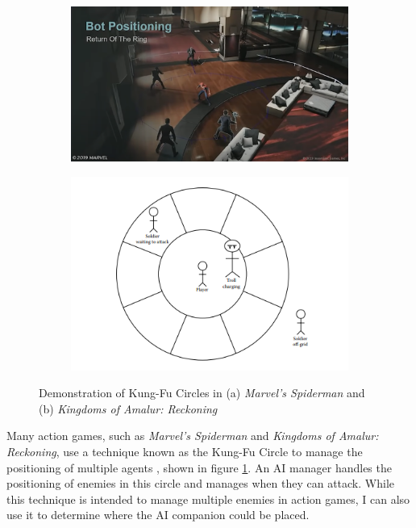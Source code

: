 \documentclass{IEEEtran}
\begin{document}
\begin{figure}
  \centering
  
  \begin{subfigure}[a]{\linewidth}
  \includegraphics[width=\linewidth]{Images/SpidermanKungFuCircle.png}
  \end{subfigure}
  
  \begin{subfigure}[b]{\linewidth}
  \includegraphics[width=\linewidth]{Images/KOARKungFuCircle.png}
  \end{subfigure}
  
  \caption{Demonstration of Kung-Fu Circles in (a) \textit{Marvel's Spiderman} and (b) \textit{Kingdoms of Amalur: Reckoning}}
  \label{fig:KungFuCircle}
\end{figure}

Many action games, such as \textit{Marvel's Spiderman} and \textit{Kingdoms of Amalur: Reckoning}, use a technique known as the Kung-Fu Circle to manage the positioning of multiple agents \cite{GAIPKungFuCircle, GDCSpiderman}, shown in figure \ref{fig:KungFuCircle}. An AI manager handles the positioning of enemies in this circle and manages when they can attack. While this technique is intended to manage multiple enemies in action games, I can also use it to determine where the AI companion could be placed.
\end{document}
